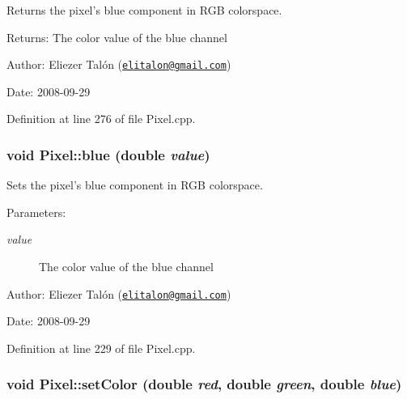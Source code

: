 Returns the pixel's blue component in RGB colorspace. 

\begin{Desc}
\item[Returns:]The color value of the blue channel\end{Desc}
\begin{Desc}
\item[Author:]Eliezer Talón (\href{mailto:elitalon@gmail.com}{\tt elitalon@gmail.com}) \end{Desc}
\begin{Desc}
\item[Date:]2008-09-29 \end{Desc}


Definition at line 276 of file Pixel.cpp.\hypertarget{class_pixel_ff3909b84c97a1c3d14a773c8825ade1}{
\subsubsection[blue]{\setlength{\rightskip}{0pt plus 5cm}void Pixel::blue (double {\em value})}}
\label{class_pixel_ff3909b84c97a1c3d14a773c8825ade1}


Sets the pixel's blue component in RGB colorspace. 

\begin{Desc}
\item[Parameters:]
\begin{description}
\item[{\em value}]The color value of the blue channel\end{description}
\end{Desc}
\begin{Desc}
\item[Author:]Eliezer Talón (\href{mailto:elitalon@gmail.com}{\tt elitalon@gmail.com}) \end{Desc}
\begin{Desc}
\item[Date:]2008-09-29 \end{Desc}


Definition at line 229 of file Pixel.cpp.\hypertarget{class_pixel_5543267a64a29c66f12a2801b101e6db}{
\subsubsection[setColor]{\setlength{\rightskip}{0pt plus 5cm}void Pixel::setColor (double {\em red}, \/  double {\em green}, \/  double {\em blue})}}
\label{class_pixel_5543267a64a29c66f12a2801b101e6db}


